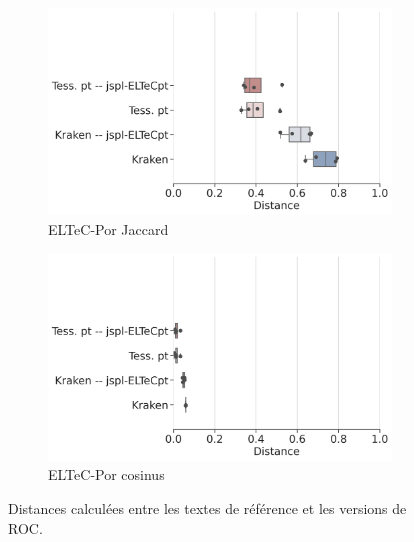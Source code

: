 \begin{figure}
   \centering
      \begin{subfigure}{0.45\textwidth}
  \includegraphics[height=.65\textwidth]{IMAGES/Boite-moustache/ELTeC-Por_REF_jaccard.png} 
        \caption{ELTeC-Por Jaccard}
   \end{subfigure}
    \begin{subfigure}{0.5\textwidth}
  \includegraphics[height=.65\textwidth]{IMAGES/Boite-moustache/ELTeC-Por_REF_cosinus.png} 
        \caption{ELTeC-Por cosinus}
   \end{subfigure}   
    \caption{Distances calculées entre les textes de référence et les versions de ROC.}
    \label{fig:distance_texte}
\end{figure}

